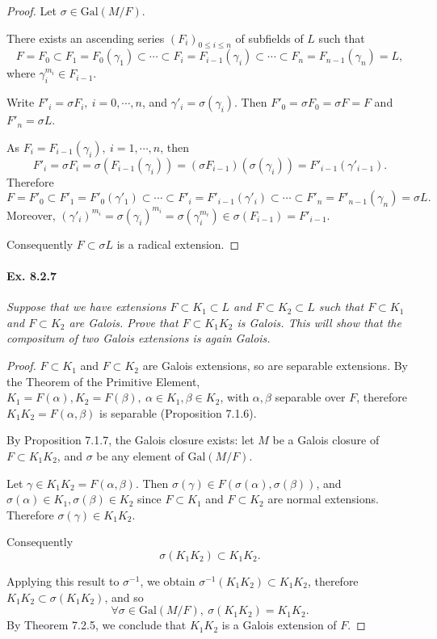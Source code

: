 \documentclass[11pt,a4paper]{article}
\newcommand{\Gal}{\mathrm{Gal}}
\begin{document}
\begin{proof}

Let $\sigma \in \Gal(M/F)$.

There exists an ascending series $(F_i)_{0\leq i \leq n}$ of subfields of $L$ such that
$$F = F_0 \subset F_1=F_0(\gamma_1) \subset \cdots \subset F_i = F_{i-1}(\gamma_i)\subset \cdots \subset F_n = F_{n-1}(\gamma_n)=L,$$
where $\gamma_i^{m_i} \in F_{i-1}$.

Write $F'_i = \sigma F_i,\ i=0,\cdots,n$, and $\gamma'_i = \sigma(\gamma_i)$. Then $F'_0 = \sigma F_0 =\sigma F = F$ and $F'_n = \sigma L$.

As $F_i = F_{i-1}(\gamma_i), \ i=1,\cdots,n$, then $$F'_i = \sigma F_i = \sigma(F_{i-1}(\gamma_i)) = (\sigma F_{i-1})(\sigma (\gamma_i)) = F'_{i-1}(\gamma'_{i-1}).$$ 
Therefore
$$F = F'_0 \subset F'_1=F'_0(\gamma'_1) \subset \cdots \subset F'_i = F'_{i-1}(\gamma'_i)\subset \cdots \subset F'_n = F'_{n-1}(\gamma_n)=\sigma L.$$
Moreover, $(\gamma'_{i})^{m_i} = \sigma(\gamma_i)^{m_i} = \sigma(\gamma_i^{m_i}) \in \sigma(F_{i-1}) = F'_{i-1}$.

Consequently $F \subset \sigma L$ is a radical extension.
\end{proof}

\paragraph{Ex. 8.2.7}

{\it Suppose that we have extensions $F \subset K_1 \subset L$ and $F\subset K_2 \subset L$ such that $F\subset K_1$ and $F \subset K_2$ are Galois. Prove that $F \subset K_1K_2$ is Galois. This will show that the compositum of two Galois extensions is again Galois.
}

\begin{proof}
$F\subset K_1$ and $F \subset K_2$ are Galois extensions, so are separable extensions. By the Theorem of the Primitive Element, $K_1 = F(\alpha), K_2=F(\beta), \ \alpha \in K_1,\beta \in K_2$, with  $\alpha, \beta$ separable over $F$, therefore $K_1K_2 = F(\alpha,\beta)$ is separable (Proposition 7.1.6).

By Proposition 7.1.7, the Galois closure exists: let $M$ be a Galois closure of $F \subset K_1K_2$, and $\sigma$ be any element of $\Gal(M/F)$.


Let  $\gamma \in K_1 K_2 = F(\alpha,\beta)$. Then $\sigma(\gamma)\in F(\sigma(\alpha),\sigma(\beta))$, and $\sigma(\alpha) \in K_1, \sigma(\beta)\in K_2$ since $F\subset K_1$ and $F \subset K_2$ are normal extensions. Therefore $\sigma(\gamma) \in K_1K_2$.
 
Consequently $$\sigma (K_1 K_2) \subset  K_1K_2.$$

Applying this result to $\sigma^{-1}$, we obtain $\sigma^{-1}(K_1K_2) \subset K_1K_2$, therefore $K_1K_2 \subset \sigma(K_1K_2)$, and so
$$\forall \sigma \in \Gal(M/F),\ \sigma (K_1K_2) = K_1 K_2.$$
By Theorem 7.2.5, we conclude that $K_1K_2$ is a Galois extension of $F$.
\end{proof}
\end{document}
